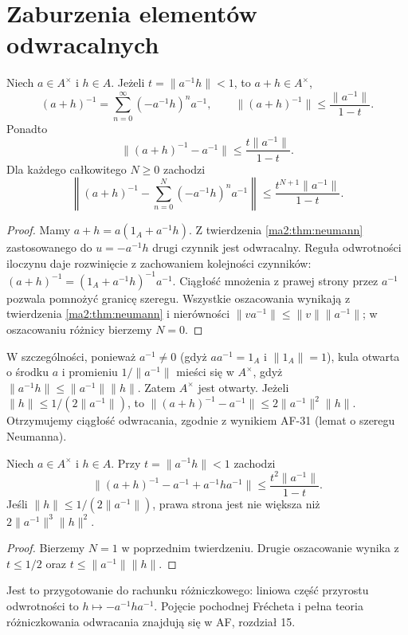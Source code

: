 \section{Zaburzenia elementów odwracalnych}

\begin{twierdzenie}
\label{ma2:thm:inverse-perturbation}
Niech $a\in A^\times$ i $h\in A$.
Jeżeli $t=\|a^{-1}h\|<1$, to $a+h\in A^\times$,
\[
 (a+h)^{-1}=\sum_{n=0}^\infty(-a^{-1}h)^n a^{-1},
 \qquad
 \|(a+h)^{-1}\|\le\frac{\|a^{-1}\|}{1-t}.
\]
Ponadto
\[
 \|(a+h)^{-1}-a^{-1}\|\le
 \frac{t\|a^{-1}\|}{1-t}.
\]
Dla każdego całkowitego $N\ge0$ zachodzi
\[
 \left\|(a+h)^{-1}
      -\sum_{n=0}^{N}(-a^{-1}h)^n a^{-1}\right\|
 \le\frac{t^{N+1}\|a^{-1}\|}{1-t}.
\]
\end{twierdzenie}
\begin{proof}
Mamy $a+h=a(1_A+a^{-1}h)$.
Z twierdzenia \ref{ma2:thm:neumann} zastosowanego
do $u=-a^{-1}h$ drugi czynnik jest odwracalny.
Reguła odwrotności iloczynu daje rozwinięcie
z zachowaniem kolejności czynników:
$(a+h)^{-1}=(1_A+a^{-1}h)^{-1}a^{-1}$.
Ciągłość mnożenia z prawej strony przez $a^{-1}$
pozwala pomnożyć granicę szeregu. Wszystkie
oszacowania wynikają z twierdzenia
\ref{ma2:thm:neumann} i nierówności
$\|va^{-1}\|\le\|v\|\|a^{-1}\|$;
w oszacowaniu różnicy bierzemy $N=0$.
\end{proof}
W szczególności, ponieważ $a^{-1}\ne0$
(gdyż $aa^{-1}=1_A$ i $\|1_A\|=1$), kula otwarta
o środku $a$ i promieniu $1/\|a^{-1}\|$
mieści się w $A^\times$,
gdyż $\|a^{-1}h\|\le\|a^{-1}\|\|h\|$.
Zatem $A^\times$ jest otwarty. Jeżeli
$\|h\|\le1/(2\|a^{-1}\|)$, to
$\|(a+h)^{-1}-a^{-1}\|\le2\|a^{-1}\|^2\|h\|$.
Otrzymujemy ciągłość odwracania, zgodnie
z wynikiem AF-31 (lemat o szeregu Neumanna).

\begin{wniosek}
\label{ma2:cor:inverse-linear}
Niech $a\in A^\times$ i $h\in A$.
Przy $t=\|a^{-1}h\|<1$ zachodzi
\[
 \|(a+h)^{-1}-a^{-1}+a^{-1}ha^{-1}\|
 \le\frac{t^2\|a^{-1}\|}{1-t}.
\]
Jeśli $\|h\|\le 1/(2\|a^{-1}\|)$, prawa strona
jest nie większa niż $2\|a^{-1}\|^3\|h\|^2$.
\end{wniosek}
\begin{proof}
Bierzemy $N=1$ w poprzednim twierdzeniu.
Drugie oszacowanie wynika z $t\le1/2$ oraz
$t\le\|a^{-1}\|\|h\|$.
\end{proof}
Jest to przygotowanie do rachunku różniczkowego:
liniowa część przyrostu odwrotności to
$h\mapsto-a^{-1}ha^{-1}$. Pojęcie pochodnej
Frécheta i pełna teoria różniczkowania
odwracania znajdują się w AF, rozdział 15.

